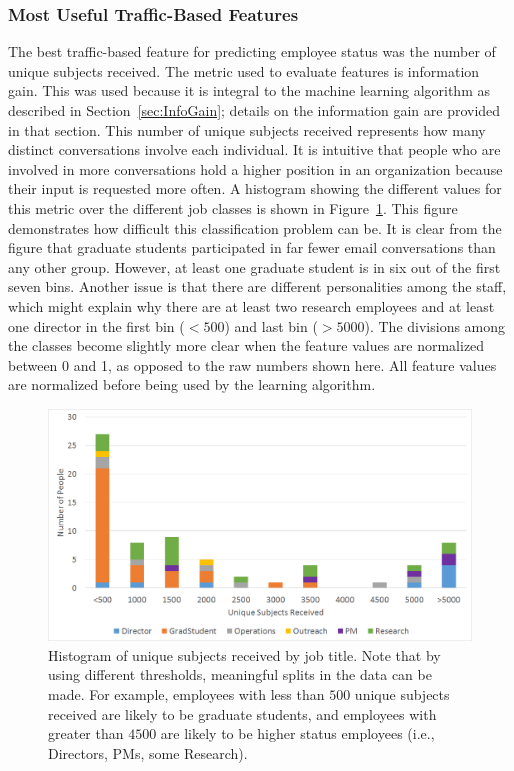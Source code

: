 \documentclass[12pt]{report}
\begin{document}
\subsubsection{Most Useful Traffic-Based Features}
The best traffic-based feature for predicting employee status was the number of unique subjects received.
The metric used to evaluate features is information gain.  This was used because it is integral to the machine learning algorithm as described in Section~\ref{sec:InfoGain}; details on the information gain are provided in that section.
This number of unique subjects received represents how many distinct conversations involve each individual.
It is intuitive that people who are involved in more conversations hold a higher position in an organization because their input is requested more often.
A histogram showing the different values for this metric over the different job classes is shown in Figure~\ref{fig:traffic_ex_hist}.
This figure demonstrates how difficult this classification problem can be.
It is clear from the figure that graduate students participated in far fewer email conversations than any other group.
However, at least one graduate student is in six out of the first seven bins.
Another issue is that there are different personalities among the staff, which might explain why there are at least two research employees and at least one director in the first bin ($<500$) and last bin ($>5000$).
The divisions among the classes become slightly more clear when the feature values are normalized between 0 and 1, as opposed to the raw numbers shown here.
All feature values are normalized before being used by the learning algorithm.
\begin{figure}[t]
    \centering
        \includegraphics[width=\columnwidth,trim={0mm 0mm 0mm 0mm},clip]{Unique_subjects_rec_hist}
        \caption[Unique subjects received histogram]{Histogram of unique subjects received by job title.  Note that by using different thresholds, meaningful splits in the data can be made.  For example, employees with less than $500$ unique subjects received are likely to be graduate students, and employees with greater than $4500$ are likely to be higher status employees (i.e., Directors, PMs, some Research).}
        \label{fig:traffic_ex_hist}
\end{figure}
\end{document}
